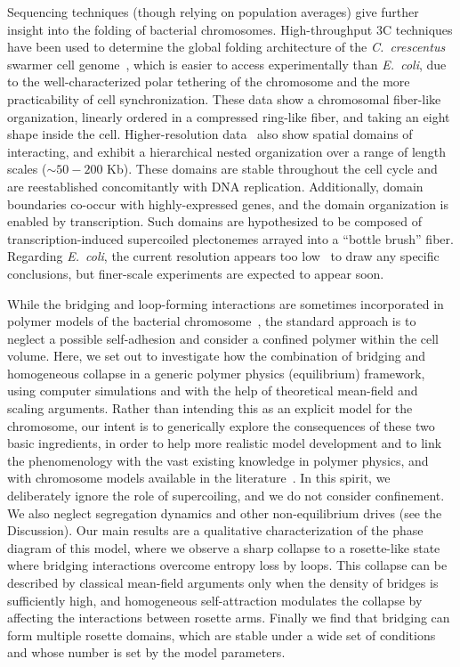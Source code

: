 \documentclass[
preprint,
a4paper,
12pt,
superscriptaddress,
pre]{revtex4}
\begin{document}
Sequencing techniques (though relying on population averages) give
further insight into the folding of bacterial chromosomes.
High-throughput 3C techniques have been used to determine the global
folding architecture of the \emph{C.~crescentus} swarmer cell
genome~\cite{Le2013,Umbarger2011}, which is easier to access
experimentally than \emph{E.~coli}, due to the well-characterized
polar tethering of the chromosome and
%
the more practicability of cell synchronization.
%
These data show a chromosomal fiber-like organization, linearly
ordered in a compressed ring-like fiber, and taking an eight shape
inside the cell.
%
Higher-resolution data~\cite{Le2013} also show spatial domains of
interacting, and exhibit a hierarchical nested organization over a
range of length scales ($\sim50-200$ Kb). These domains are stable
throughout the cell cycle and are reestablished concomitantly with DNA
replication.  Additionally, domain boundaries co-occur with
highly-expressed genes, and the domain organization is enabled by
transcription. Such domains are hypothesized to be composed of
transcription-induced supercoiled plectonemes arrayed into a ``bottle
brush'' fiber.
Regarding \emph{E.~coli}, the current resolution appears too
low~\cite{Cagliero2013} to draw any specific conclusions, but
finer-scale experiments are expected to appear soon.



While the bridging and loop-forming interactions are sometimes
incorporated in polymer models of the bacterial
chromosome~\cite{Junier2013,Fritsche2012,Heermann2012}, the standard
approach is to neglect a possible self-adhesion and consider a
confined polymer within the cell volume.
Here, we set out to investigate how the combination of bridging and
homogeneous collapse in a generic polymer physics (equilibrium)
framework, using computer simulations and with the help of theoretical
mean-field and scaling arguments.
Rather than intending this as an explicit model for the chromosome,
our intent is to generically explore the consequences of these two
basic ingredients, in order to help more realistic model development
and to link the phenomenology with the vast existing knowledge in
polymer physics, and with chromosome models available in the
literature~\cite{Barbieri2013a,Benza2012}.
In this spirit, we deliberately ignore the role of supercoiling, and
we do not consider confinement. We also neglect segregation dynamics
and other non-equilibrium drives (see the Discussion).
Our main results are a qualitative characterization of the phase
diagram of this model, where we observe a sharp collapse to a
rosette-like state where bridging interactions overcome entropy loss
by loops. This collapse can be described by classical mean-field
arguments only when the density of bridges is sufficiently high, and
homogeneous self-attraction modulates the collapse by affecting the
interactions between rosette arms. Finally we find that bridging can
form multiple rosette domains, which are stable under a wide set of
conditions and whose number is set by the model parameters.
\end{document}
